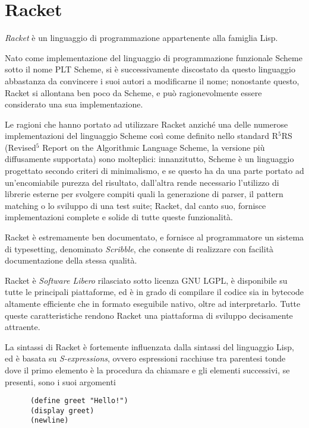 \section{Racket}

\emph{Racket} \`e un linguaggio di programmazione appartenente alla
famiglia Lisp.

Nato come implementazione del linguaggio di programmazione funzionale Scheme
sotto il nome PLT Scheme, si \`e successivamente discostato da questo
linguaggio abbastanza da convincere i suoi autori a modificarne il nome;
nonostante questo, Racket si allontana ben poco da Scheme, e pu\`o
ragionevolmente essere considerato una sua implementazione.

Le ragioni che hanno portato ad utilizzare Racket anzich\'e una delle
numerose implementazioni del linguaggio Scheme cos\`i come definito nello
standard R$^{5}$RS (Revised$^{5}$ Report on the Algorithmic Language
Scheme\cite{r5rs}, la versione pi\`u diffusamente supportata) sono
molteplici: innanzitutto, Scheme \`e un linguaggio progettato secondo
criteri di minimalismo, e se questo ha da una parte portato ad
un'encomiabile purezza del risultato, dall'altra rende necessario
l'utilizzo di librerie esterne per svolgere compiti quali la generazione di
parser, il pattern matching o lo sviluppo di una test suite; Racket, dal
canto suo, fornisce implementazioni complete e solide di tutte queste
funzionalit\`a.

Racket \`e estremamente ben documentato, e fornisce al programmatore un
sistema di typesetting, denominato \emph{Scribble}, che consente di
realizzare con facilit\`a documentazione della stessa qualit\`a.

Racket \`e \emph{Software Libero} rilasciato sotto licenza GNU LGPL, \`e
disponibile su tutte le principali piattaforme, ed \`e in grado di compilare
il codice sia in bytecode altamente efficiente che in formato eseguibile
nativo, oltre ad interpretarlo. Tutte queste caratteristiche rendono Racket
una piattaforma di sviluppo decisamente attraente.

La sintassi di Racket \`e fortemente influenzata dalla sintassi del
linguaggio Lisp, ed \`e basata su \emph{S-expressions}, ovvero espressioni
racchiuse tra parentesi tonde dove il primo elemento \`e la procedura
da chiamare e gli elementi successivi, se presenti, sono i suoi argomenti

\begin{lstlisting}
      (define greet "Hello!")
      (display greet)
      (newline)
\end{lstlisting}

